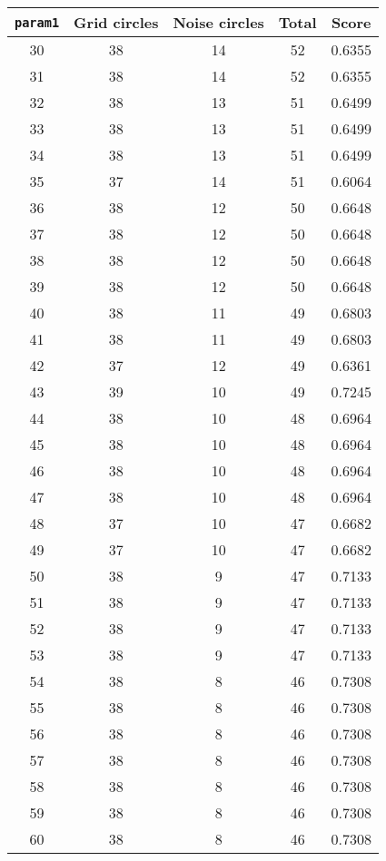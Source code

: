 \documentclass[letterpaper, 12pt]{article}
\begin{document}
\begin{longtable}{|c|c|c|c|c|}
\hline
\textbf{\texttt{param1}} & \textbf{Grid circles} & \textbf{Noise circles} & \textbf{Total} & \textbf{Score} \\
\hline
30 & 38 & 14 & 52 & 0.6355 \\
\hline
31 & 38 & 14 & 52 & 0.6355 \\
\hline
32 & 38 & 13 & 51 & 0.6499 \\
\hline
33 & 38 & 13 & 51 & 0.6499 \\
\hline
34 & 38 & 13 & 51 & 0.6499 \\
\hline
35 & 37 & 14 & 51 & 0.6064 \\
\hline
36 & 38 & 12 & 50 & 0.6648 \\
\hline
37 & 38 & 12 & 50 & 0.6648 \\
\hline
38 & 38 & 12 & 50 & 0.6648 \\
\hline
39 & 38 & 12 & 50 & 0.6648 \\
\hline
40 & 38 & 11 & 49 & 0.6803 \\
\hline
41 & 38 & 11 & 49 & 0.6803 \\
\hline
42 & 37 & 12 & 49 & 0.6361 \\
\hline
43 & 39 & 10 & 49 & 0.7245 \\
\hline
44 & 38 & 10 & 48 & 0.6964 \\
\hline
45 & 38 & 10 & 48 & 0.6964 \\
\hline
46 & 38 & 10 & 48 & 0.6964 \\
\hline
47 & 38 & 10 & 48 & 0.6964 \\
\hline
48 & 37 & 10 & 47 & 0.6682 \\
\hline
49 & 37 & 10 & 47 & 0.6682 \\
\hline
50 & 38 & 9 & 47 & 0.7133 \\
\hline
51 & 38 & 9 & 47 & 0.7133 \\
\hline
52 & 38 & 9 & 47 & 0.7133 \\
\hline
53 & 38 & 9 & 47 & 0.7133 \\
\hline
54 & 38 & 8 & 46 & 0.7308 \\
\hline
55 & 38 & 8 & 46 & 0.7308 \\
\hline
56 & 38 & 8 & 46 & 0.7308 \\
\hline
57 & 38 & 8 & 46 & 0.7308 \\
\hline
58 & 38 & 8 & 46 & 0.7308 \\
\hline
59 & 38 & 8 & 46 & 0.7308 \\
\hline
60 & 38 & 8 & 46 & 0.7308 \\

\end{longtable}
\end{document}
